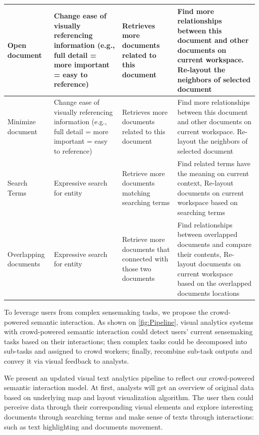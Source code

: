 \documentclass[journal]{vgtc}                %
\begin{document}
\begin{table}[t]
\begin{tabular}{| m{2cm} | m{6cm} | m{4cm} | m{4cm} |}
Open document & Change ease of visually referencing information (e.g., full detail = more important = easy to reference) & Retrieves more documents related to this document & Find more relationships between this document and other documents on current workspace. Re-layout the neighbors of selected document \\ \hline

Minimize document & Change ease of visually referencing information (e.g., full detail = more important = easy to reference) & Retrieves more documents related to this document & Find more relationships between this document and other documents on current workspace. Re-layout the neighbors of selected document \\ \hline

Search Terms & Expressive search for entity & Retrieve more documents matching searching terms & Find related terms have the meaning on current context, Re-layout documents on current workspace based on searching terms \\ \hline


Overlapping documents
& Expressive search for entity & Retrieve more documents that connected with those two documents & Find relationships between overlapped documents and compare their contents, Re-layout documents on current workspace based on the overlapped documents locations\\ \hline
\end{tabular}
\end{table}



To leverage users from complex sensemaking tasks, we propose the crowd-powered semantic interaction. As shown on \autoref{fig:Pipeline}, visual analytics systems with crowd-powered semantic interaction could detect users' current sensemaking tasks based on their interactions; then complex tasks could be decomposed into sub-tasks and assigned to crowd workers; finally, recombine sub-task outputs and convey it via visual feedback to analysts.

We present an updated visual text analytics pipeline to reflect our crowd-powered semantic interaction model.  At first, analysts will get an overview of original data based on underlying map and layout visualization algorithm. The user then could perceive data through their corresponding visual elements and explore interesting documents through searching terms and make sense of texts through interactions: such as text highlighting and documents movement.
\end{document}

